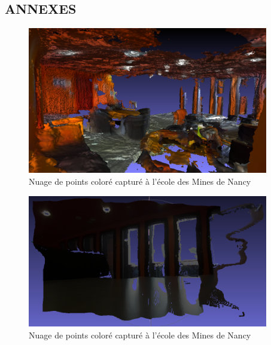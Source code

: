 \thispagestyle{empty} %
\begin{center}
    \section{\huge\textbf{{ANNEXES}}}
\end{center}

\renewcommand{\listfigurename}{Sommaire des figures} %
\listoffigures %

\renewcommand{\listtablename}{Sommaire des tableaux} %
\listoftables %
\clearpage

\begin{figure}[h]
    \centering
    \includegraphics[width=10.5cm]{images/zed2_nuage_colore_2.png}
    \caption{Nuage de points coloré capturé à l'école des Mines de Nancy}
    \label{fig:zed2_1}
\end{figure}

\begin{figure}[h]
    \centering
    \includegraphics[width=10.5cm]{images/zed2_nuage_colore.png}
    \caption{Nuage de points coloré capturé à l'école des Mines de Nancy}
    \label{fig:zed2_2}
\end{figure}

